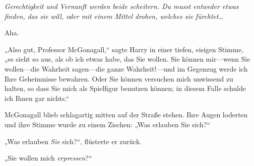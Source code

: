 \emph{Gerechtigkeit und Vernunft werden beide scheitern. Du musst entweder etwas finden, das sie will, oder mit einem Mittel drohen, welches sie fürchtet…}

Aha.

„Also gut, Professor McGonagall,“ sagte Harry in einer tiefen, eisigen Stimme, „es sieht so aus, als ob ich etwas habe, das Sie wollen. Sie können mir—wenn Sie wollen—die Wahrheit sagen—die ganze Wahrheit!—und im Gegenzug werde ich Ihre Geheimnisse bewahren. Oder Sie können versuchen mich unwissend zu halten, so dass Sie mich als Spielfigur benutzen können; in diesem Falle schulde ich Ihnen gar nichts.“

McGonagall blieb schlagartig mitten auf der Straße stehen. Ihre Augen loderten und ihre Stimme wurde zu einem Zischen: „Was erlauben Sie sich?“

„Was erlauben \emph{Sie} sich?“, flüsterte er zurück.

„Sie wollen mich \emph{erpressen}?“

